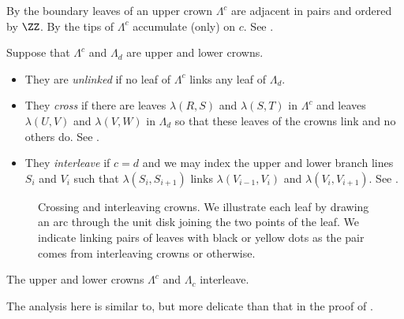 \documentclass[12pt]{amsart}
\begin{document}
By  the boundary leaves of an upper crown $\Lambda^c$ are adjacent in pairs and ordered by $\ZZ$.  By  the tips of $\Lambda^c$ accumulate (only) on $c$.  See . 

\begin{definition}
\label{Def:LinkedCrowns}
Suppose that $\Lambda^c$ and $\Lambda_d$ are upper and lower crowns. 
\begin{itemize}
\item 
They are \emph{unlinked} if no leaf of $\Lambda^c$ links any leaf of $\Lambda_d$. 
\item 
They \emph{cross} if there are leaves $\lambda(R,S)$ and $\lambda(S, T)$ in $\Lambda^c$ and leaves $\lambda(U,V)$ and $\lambda(V,W)$ in $\Lambda_d$ so that these leaves of the crowns link and no others do.  See .
\item 
They \emph{interleave} if $c = d$ and we may index the upper and lower branch lines $S_i$ and $V_i$ such that $\lambda(S_i,S_{i+1})$ links $\lambda(V_{i-1},V_i)$ and $\lambda(V_i,V_{i+1})$.  See . \qedhere
\end{itemize}
\end{definition}

\begin{figure}[htb]
\centering
{}
\qquad
{}
\caption{Crossing and interleaving crowns.  We illustrate each leaf by drawing an arc through the unit disk joining the two points of the leaf.  We indicate linking pairs of leaves with black or yellow dots as the pair comes from interleaving crowns or otherwise.}
\label{Fig:LeafIdentifications}
\end{figure}

\begin{lemma}
\label{Lem:CrownsInterleave}
The upper and lower crowns $\Lambda^c$ and $\Lambda_c$ interleave.  
\end{lemma}

The analysis here is similar to, but more delicate than that in the proof of .
\end{document}
